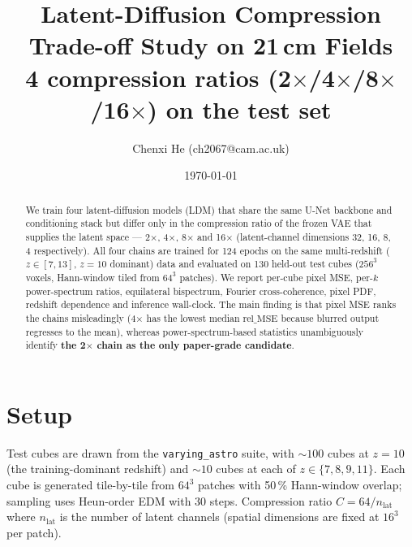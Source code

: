 \documentclass[11pt,a4paper]{article}
\title{Latent-Diffusion Compression Trade-off Study on 21\,cm Fields\\
       \large 4 compression ratios (2$\times$/4$\times$/8$\times$/16$\times$) on the test set}
\author{Chenxi He (ch2067@cam.ac.uk)}
\date{\today}
\newcommand{\relMSE}{\text{rel\_MSE}}
\begin{document}
\maketitle

\begin{abstract}
We train four latent-diffusion models (LDM) that share the same U-Net backbone and
conditioning stack but differ only in the compression ratio of the frozen VAE that
supplies the latent space --- 2$\times$, 4$\times$, 8$\times$ and 16$\times$
(latent-channel dimensions 32, 16, 8, 4 respectively).  All four chains are trained
for 124 epochs on the same multi-redshift ($z\!\in\![7,13]$, $z\!=\!10$ dominant)
data and evaluated on 130 held-out test cubes ($256^3$ voxels, Hann-window tiled
from $64^3$ patches).  We report per-cube pixel MSE, per-$k$ power-spectrum ratios,
equilateral bispectrum, Fourier cross-coherence, pixel PDF, redshift dependence and
inference wall-clock.  The main finding is that pixel MSE ranks the chains
misleadingly (4$\times$ has the lowest median $\relMSE$ because blurred output
regresses to the mean), whereas power-spectrum-based statistics unambiguously
identify \textbf{the 2$\times$ chain as the only paper-grade candidate}.
\end{abstract}

\section{Setup}
\label{sec:setup}

Test cubes are drawn from the \texttt{varying\_astro} suite, with $\sim\!100$
cubes at $z\!=\!10$ (the training-dominant redshift) and $\sim\!10$ cubes at each
of $z\!\in\!\{7,8,9,11\}$.  Each cube is generated tile-by-tile from $64^3$ patches
with 50\,\% Hann-window overlap; sampling uses Heun-order EDM with 30 steps.
Compression ratio $C\!=\!64/n_\mathrm{lat}$ where $n_\mathrm{lat}$ is the number of
latent channels (spatial dimensions are fixed at $16^3$ per patch).
\end{document}
